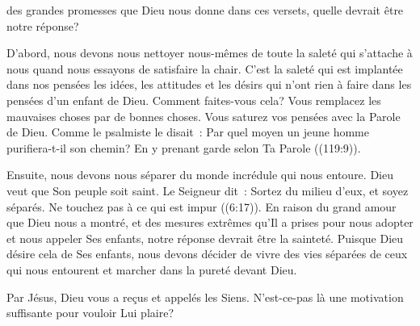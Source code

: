 


 des grandes promesses que Dieu nous donne
 dans ces versets, quelle devrait être notre réponse? 

D'abord, nous devons nous nettoyer nous-mêmes de toute la saleté
 qui s'attache à nous quand nous essayons de satisfaire la chair.
 C'est la saleté qui est implantée dans nos pensées
 \ocadr les idées, les attitudes et les désirs qui n'ont rien à faire
 dans les pensées d'un enfant de Dieu. Comment faites-vous cela?
 Vous remplacez les mauvaises choses par de bonnes choses.
 Vous saturez vos pensées avec la Parole de Dieu.
 Comme le psalmiste le disait~: 
 \og Par quel moyen un jeune homme purifiera-t-il son chemin?
 En y prenant garde selon Ta Parole \fg{} ((119:9)).


Ensuite, nous devons nous séparer du monde incrédule qui nous entoure.
 Dieu veut que Son peuple soit saint. Le Seigneur dit~: 
 \og Sortez du milieu d’eux, et soyez séparés.
 Ne touchez pas à ce qui est impur \fg{} ((6:17)).
 En raison du grand amour que Dieu nous a montré,
 et des mesures extrêmes qu'Il a prises pour nous adopter
 et nous appeler Ses enfants, notre réponse devrait être la sainteté.
 Puisque Dieu désire cela de Ses enfants, nous devons décider de vivre
 des vies séparées de ceux qui nous entourent et marcher dans la pureté
 devant Dieu.

Par Jésus, Dieu vous a reçus et appelés les Siens.
 N'est-ce-pas là une motivation suffisante pour vouloir Lui plaire?

\dvrule





